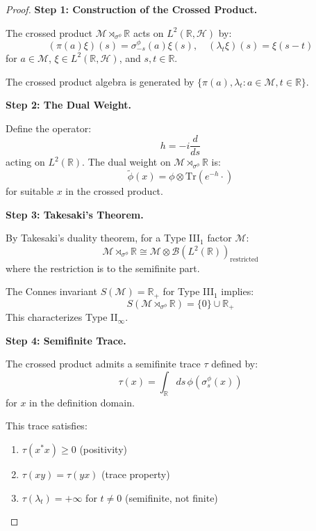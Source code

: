 \documentclass[12pt,a4paper]{article}
\begin{document}
\begin{proof}
\textbf{Step 1: Construction of the Crossed Product.}

The crossed product $\mathcal{M} \rtimes_{\sigma^\phi} \mathbb{R}$ acts on $L^2(\mathbb{R}, \mathcal{H})$ by:
\begin{equation}
(\pi(a)\xi)(s) = \sigma_{-s}^\phi(a)\xi(s), \quad (\lambda_t \xi)(s) = \xi(s - t)
\end{equation}
for $a \in \mathcal{M}$, $\xi \in L^2(\mathbb{R}, \mathcal{H})$, and $s, t \in \mathbb{R}$.

The crossed product algebra is generated by $\{\pi(a), \lambda_t : a \in \mathcal{M}, t \in \mathbb{R}\}$.

\textbf{Step 2: The Dual Weight.}

Define the operator:
\begin{equation}
h = -i\frac{d}{ds}
\end{equation}
acting on $L^2(\mathbb{R})$. The dual weight on $\mathcal{M} \rtimes_{\sigma^\phi} \mathbb{R}$ is:
\begin{equation}
\tilde{\phi}(x) = \phi \otimes \text{Tr}(e^{-h} \cdot)
\end{equation}
for suitable $x$ in the crossed product.

\textbf{Step 3: Takesaki's Theorem.}

By Takesaki's duality theorem, for a Type III$_1$ factor $\mathcal{M}$:
\begin{equation}
\mathcal{M} \rtimes_{\sigma^\phi} \mathbb{R} \cong \mathcal{M} \otimes \mathcal{B}(L^2(\mathbb{R}))_{\text{restricted}}
\end{equation}
where the restriction is to the semifinite part.

The Connes invariant $S(\mathcal{M}) = \mathbb{R}_+$ for Type III$_1$ implies:
\begin{equation}
S(\mathcal{M} \rtimes_{\sigma^\phi} \mathbb{R}) = \{0\} \cup \mathbb{R}_+
\end{equation}
This characterizes Type II$_\infty$.

\textbf{Step 4: Semifinite Trace.}

The crossed product admits a semifinite trace $\tau$ defined by:
\begin{equation}
\tau(x) = \int_{\mathbb{R}} ds \, \phi(\sigma_s^\phi(x))
\end{equation}
for $x$ in the definition domain.

This trace satisfies:
\begin{enumerate}
    \item $\tau(x^*x) \geq 0$ (positivity)
    \item $\tau(xy) = \tau(yx)$ (trace property)
    \item $\tau(\lambda_t) = +\infty$ for $t \neq 0$ (semifinite, not finite)
\end{enumerate}


\end{proof}
\end{document}

